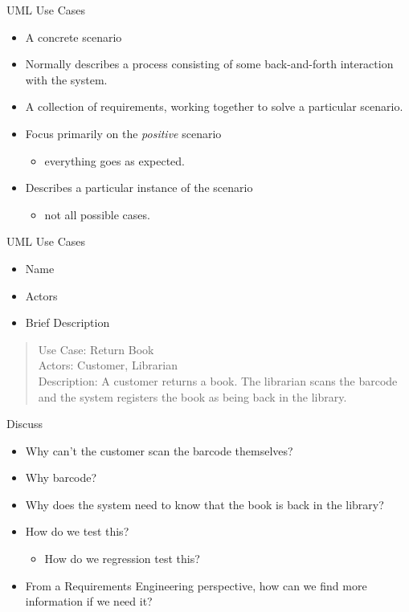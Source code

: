 \documentclass[10pt,t,a4paper]{beamer}
\begin{document}
\begin{frame}[label=sec-1-5]{UML Use Cases}
\begin{itemize}
\item A concrete scenario
\item Normally describes a process consisting of some back-and-forth interaction with the system.
\item A collection of requirements, working together to solve a particular scenario.
\item Focus primarily on the \emph{positive} scenario
\begin{itemize}
\item everything goes as expected.
\end{itemize}
\item Describes a particular instance of the scenario
\begin{itemize}
\item not all possible cases.
\end{itemize}
\end{itemize}
\end{frame}
\begin{frame}[shrink=15,label=sec-1-6]{UML Use Cases}

\begin{itemize}
\item Name
\item Actors
\item Brief Description
\end{itemize}

\begin{verse}
Use Case: Return Book \\
Actors: Customer, Librarian \\
Description: A customer returns a book. The librarian scans the barcode and the system registers the book as being back in the library. \\
\end{verse}

\begin{block}{Discuss}
\begin{itemize}
\item Why can't the customer scan the barcode themselves?
\item Why barcode?
\item Why does the system need to know that the book is back in the library?
\item How do we test this?
\begin{itemize}
\item How do we regression test this?
\end{itemize}
\item From a Requirements Engineering perspective, how can we find more information if we need it?
\end{itemize}
\end{block}
\end{frame}
\end{document}
